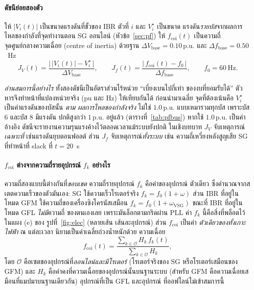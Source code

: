 \documentclass[12pt,a4paper]{article}
\newcommand{\pu}{\,\mathrm{p.u.}}
\begin{document}
\paragraph{ดัชนีย่อยสองตัว}
ให้ $|V_i(t)|$ เป็นขนาดแรงดันที่ขั้วของ IBR ตัวที่ $i$ และ $V_i^{\star}$ เป็นขนาด
แรงดัน\emph{รายบัส}จากผลการไหลของกำลังที่จุดทำงานตอน SG ออนไลน์
(หัวข้อ~\ref{sec:pf}) ให้ $f_{\mathrm{coi}}(t)$ เป็นความถี่จุดศูนย์กลางความเฉื่อย
(centre of inertia) ด้วยฐาน $\Delta V_{\mathrm{base}}=0.10\pu$ และ
$\Delta f_{\mathrm{base}}=0.50$~Hz
\begin{equation}
  J_V(t)=\frac{\bigl|\,|V_i(t)|-V_i^{\star}\,\bigr|}{\Delta V_{\mathrm{base}}},
  \qquad
  J_f(t)=\frac{\bigl|\,f_{\mathrm{coi}}(t)-f_0\,\bigr|}{\Delta f_{\mathrm{base}}},
  \qquad f_0=60~\mathrm{Hz}.
  \label{eq:jvjf}
\end{equation}

\emph{อ่านสมการนี้อย่างไร} ทั้งสองดัชนีเป็นอัตราส่วนไร้หน่วย ``เบี่ยงเบนไปกี่เท่า
ของงบที่ยอมรับได้'' ตัวหารจึงทำหน้าที่แปลงหน่วยจริง (pu และ Hz) ให้เทียบกันได้
ก่อนนำมาเฉลี่ย จุดที่ต้องเน้นคือ $V_i^{\star}$ เป็นค่าแรงดันของบัสนั้น \emph{ตาม
ผลการไหลของกำลังจริง} ไม่ใช่ $1.0\pu$ แบบเหมารวมทุกบัส เพราะบัส 6 และบัส 8 มีแรงดัน
ปกติสูงกว่า $1\pu$ อยู่แล้ว (ตารางที่~\ref{tab:pfbus}) หากใช้ $1.0\pu$ เป็นค่าอ้างอิง
ดัชนีจะรายงานความรุนแรงค้างไว้ตลอดเวลาแม้ระบบยังปกติ ในเชิงบทบาท $J_V$ จับเหตุการณ์
\emph{เฉพาะที่} เช่นแรงดันยุบตอนฟอลต์ ส่วน $J_f$ จับเหตุการณ์\emph{ทั้งระบบ} เช่น
ความถี่เหวี่ยงหลังสูญเสีย SG ที่ทำหน้าที่ slack ที่ $t=20$~s

\paragraph{$f_{\mathrm{coi}}$ ต่างจากความถี่รายอุปกรณ์ $f_k$ อย่างไร}
ความถี่สองแบบนี้ต่างกันที่\emph{ขอบเขต} ความถี่รายอุปกรณ์ $f_k$ คือค่าของอุปกรณ์
ตัวเดียว ซึ่งคำนวณจากสเตตความเร็วของตัวมันเอง: SG ใช้ความเร็วโรเตอร์จริง
$f_k=f_0(1+\omega)$ ส่วน IBR ที่อยู่ในโหมด GFM ใช้ความถี่ของเครื่องซิงโครนัสเสมือน
$f_k=f_0(1+\omega_{\mathrm{VSG}})$ ขณะที่ IBR ที่อยู่ในโหมด GFL \emph{ไม่มี}ความถี่
ของตนเองเลย เพราะมันล็อกตามกริดผ่าน PLL ค่า $f_k$ นี้คือสิ่งที่พล็อตไว้ในแผง (e) ของ
รูปที่~\ref{fig:elec} (หลายเส้น เส้นละอุปกรณ์) ส่วน $f_{\mathrm{coi}}$ เป็นค่า
\emph{ตัวเดียวของทั้งเกาะไฟฟ้า} ณ แต่ละเวลา นิยามเป็นค่าเฉลี่ยถ่วงน้ำหนักด้วย
ความเฉื่อย
\begin{equation}
  f_{\mathrm{coi}}(t)=\frac{\sum_{k\in\mathcal{O}} H_k\,f_k(t)}
                           {\sum_{k\in\mathcal{O}} H_k},
  \label{eq:fcoi}
\end{equation}
โดย $\mathcal{O}$ คือเซตของอุปกรณ์ที่\emph{ออนไลน์และมีโรเตอร์} (โรเตอร์จริงของ SG
หรือโรเตอร์เสมือนของ GFM) และ $H_k$ คือค่าคงที่ความเฉื่อยของอุปกรณ์นั้นบนฐานระบบ
(สำหรับ GFM คือความเฉื่อยเสมือนที่แมปมาบนฐานเดียวกัน) อุปกรณ์ที่เป็น GFL และอุปกรณ์
ที่ออฟไลน์ไม่เข้าสมการนี้
\end{document}

